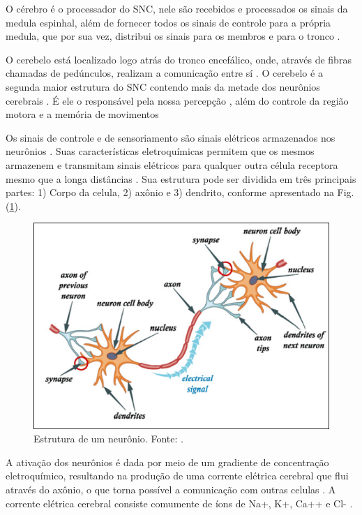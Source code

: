 O cérebro é o processador do SNC, nele são recebidos e processados os sinais da medula espinhal, além de fornecer todos os sinais de controle para a própria medula, que por sua vez, distribui os sinais para os membros e para o tronco \cite{KANDEL}.

O cerebelo está localizado logo atrás do tronco encefálico, onde, através de fibras chamadas de pedúnculos, realizam a comunicação entre sí \cite{KANDEL}. O cerebelo é a segunda maior estrutura do SNC contendo mais da metade dos neurônios cerebrais \cite{SIULYDissertacao}. É ele o responsável pela nossa percepção \cite{alvarezneurobiomecanismos}, além do controle da região motora e a memória de movimentos \cite{SIULYDissertacao,alvarezneurobiomecanismos}

Os sinais de controle e de sensoriamento são sinais elétricos armazenados nos neurônios \cite{KANDEL}. Suas características eletroquímicas permitem que os mesmos armazenem e transmitam sinais elétricos para qualquer outra célula receptora mesmo que a longa distâncias \cite{SIULYDissertacao}. Sua estrutura pode ser dividida em três principais partes: 1) Corpo da celula, 2) axônio e 3) dendrito, conforme apresentado na Fig. (\ref{neuronParts}).
\begin{figure}[h]
	\centering
	\includegraphics[keepaspectratio=true,scale=1.0]{figuras/Estrutura_neuronio.PNG}
	\caption{Estrutura de um neurônio. Fonte: \cite{SIULYDissertacao}.}
	\label{neuronParts}
\end{figure}

A ativação dos neurônios é dada por meio de um gradiente de concentração eletroquímico, resultando na produção de uma corrente elétrica cerebral que flui através do axônio, o que torna possível a comunicação com outras celulas \cite{SIULYDissertacao}. A corrente elétrica cerebral consiste comumente de íons de Na+, K+, Ca++ e Cl- \cite{EEGSignals}.

